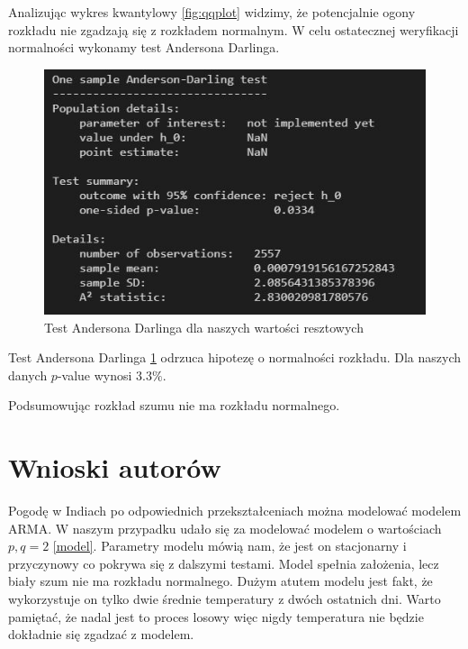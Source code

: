 \documentclass[12pt]{article}
\begin{document}
Analizując wykres kwantylowy \ref{fig:qqplot} widzimy, że potencjalnie ogony rozkładu nie zgadzają się z rozkładem normalnym. W celu ostatecznej weryfikacji normalności wykonamy test Andersona Darlinga. 
\begin{figure}[H]
	\centering
	\includegraphics[width=3\columnwidth/4]{img/ad_test.png}
	\caption{Test Andersona Darlinga dla naszych wartości resztowych}
	\label{Test_AD}
\end{figure}
Test Andersona Darlinga \ref{Test_AD} odrzuca hipotezę o normalności rozkładu. Dla naszych danych $p$-value wynosi $3.3\%$. 

Podsumowując rozkład szumu nie ma rozkładu normalnego.
	\section{Wnioski autorów}
	Pogodę w Indiach po odpowiednich przekształceniach można modelować modelem ARMA. W naszym przypadku udało się za modelować modelem o wartościach $p,q = 2$ \ref{model}. Parametry modelu mówią nam, że jest on stacjonarny i przyczynowy co pokrywa się z dalszymi testami. Model spełnia założenia, lecz biały szum nie ma rozkładu normalnego. Dużym atutem modelu jest fakt, że wykorzystuje on tylko dwie średnie temperatury z dwóch ostatnich dni. Warto pamiętać, że nadal jest to proces losowy więc nigdy temperatura nie będzie dokładnie się zgadzać z modelem. 
	
\end{document}
